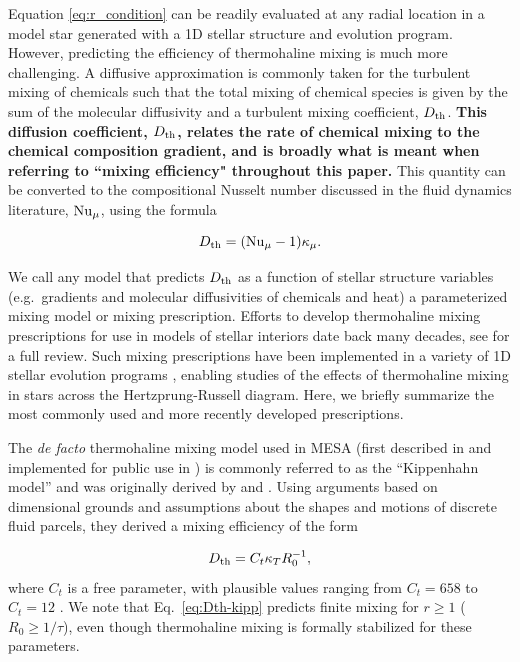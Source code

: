 %
Equation \eqref{eq:r_condition} 
can be readily evaluated at any radial location in a model star generated with a 1D stellar structure and evolution program. However, predicting the efficiency of thermohaline mixing is much more challenging. A diffusive approximation is commonly taken for the turbulent mixing of chemicals such that the total mixing of chemical species is given by the sum of the molecular diffusivity and a turbulent mixing coefficient, $D_\mathrm{th}$. \textbf{This diffusion coefficient, $D_\mathrm{th}$, relates the rate of chemical mixing to the chemical composition gradient, and is broadly what is meant when referring to ``mixing efficiency" throughout this paper.} This quantity can be converted to the compositional Nusselt number discussed in the fluid dynamics literature, $\mathrm{Nu}_\mu$, using the formula

\begin{equation} \label{eq:Dth_from_Nu}
    \Dth = (\Numu - 1)\kappa_\mu.
\end{equation}

We call any model that predicts $D_\mathrm{th}$ as a function of stellar structure variables (e.g.~gradients and molecular diffusivities of chemicals and heat) a parameterized mixing model or mixing prescription. 
Efforts to develop thermohaline mixing prescriptions for use in models of stellar interiors date back many decades, see \citet{garaud_DDC_review_2018} for a full review. 
Such mixing prescriptions have been implemented in a variety of 1D stellar evolution programs \citep[see][and references therein]{lattanzio_etal_2015}, enabling studies of the effects of thermohaline mixing in stars across the Hertzprung-Russell diagram. 
Here, we briefly summarize the most commonly used and more recently developed prescriptions.

The \textit{de facto} thermohaline mixing model used in MESA (first described in \citealt{CantielloLanger2010} and implemented for public use in \citealt{mesa2}) is commonly referred to as the ``Kippenhahn model'' and was originally derived by \citet{Ulrich1972} and \citet{kippenhahn_etal_1980}.
Using arguments based on dimensional grounds and assumptions about the shapes and motions of discrete fluid parcels, they derived a mixing efficiency of the form

\begin{equation} \label{eq:Dth-kipp}
    \Dth = C_t \kappa_T R_0^{-1},
\end{equation}
\citep[see Eq.~(5) of][]{charbonnel_thermohaline_2007}
where $C_t$ is a free parameter, with plausible values ranging from $C_t = 658$ \citep{Ulrich1972} to $C_t = 12$ \citep{kippenhahn_etal_1980}. 
We note that Eq.~\eqref{eq:Dth-kipp} predicts finite mixing for $r \geq 1$ ($R_0 \geq 1/\tau$), even though thermohaline mixing is formally stabilized for these parameters.

